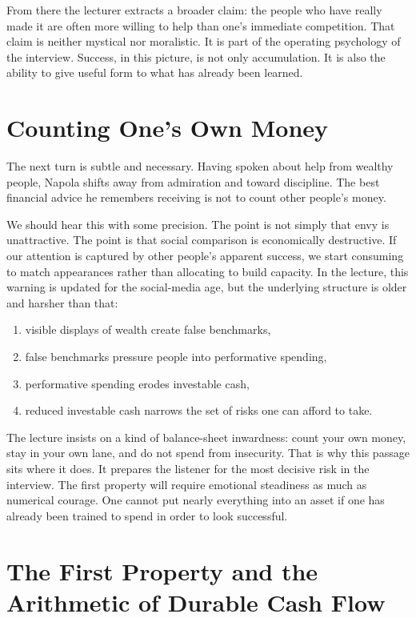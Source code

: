 From there the lecturer extracts a broader claim: the people who have really made it are often more willing to help than one's immediate competition. That claim is neither mystical nor moralistic. It is part of the operating psychology of the interview. Success, in this picture, is not only accumulation. It is also the ability to give useful form to what has already been learned.

\section{Counting One's Own Money}

The next turn is subtle and necessary. Having spoken about help from wealthy people, Napola shifts away from admiration and toward discipline. The best financial advice he remembers receiving is not to count other people's money.

We should hear this with some precision. The point is not simply that envy is unattractive. The point is that social comparison is economically destructive. If our attention is captured by other people's apparent success, we start consuming to match appearances rather than allocating to build capacity. In the lecture, this warning is updated for the social-media age, but the underlying structure is older and harsher than that:
\begin{enumerate}
\item visible displays of wealth create false benchmarks,
\item false benchmarks pressure people into performative spending,
\item performative spending erodes investable cash,
\item reduced investable cash narrows the set of risks one can afford to take.
\end{enumerate}

The lecture insists on a kind of balance-sheet inwardness: count your own money, stay in your own lane, and do not spend from insecurity. That is why this passage sits where it does. It prepares the listener for the most decisive risk in the interview. The first property will require emotional steadiness as much as numerical courage. One cannot put nearly everything into an asset if one has already been trained to spend in order to look successful.

\section{The First Property and the Arithmetic of Durable Cash Flow}

